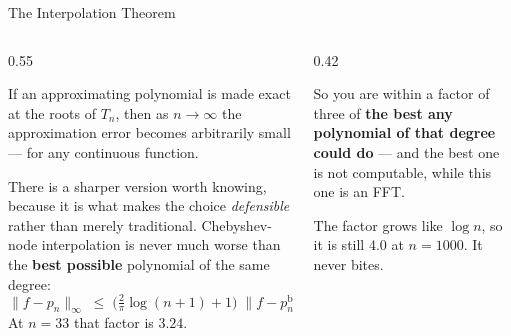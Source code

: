 \begin{frame}{The Interpolation Theorem}
\begin{columns}[T]
\begin{column}{0.55\textwidth}
\small
\begin{conceptbox}[title=\textbf{Chebyshev Interpolation Theorem}]\small
If an approximating polynomial is made exact at the roots of $T_n$, then as $n\to\infty$ the approximation error becomes arbitrarily small --- for any continuous function.
\end{conceptbox}
\medskip
There is a sharper version worth knowing, because it is what makes the choice \emph{defensible} rather than merely traditional. Chebyshev-node interpolation is never much worse than the \textbf{best possible} polynomial of the same degree:
\[
  \|f-p_n\|_{\infty}\;\le\;\Big(\tfrac{2}{\pi}\log(n+1)+1\Big)\;\|f-p_n^{\text{best}}\|_{\infty}.
\]
At $n=33$ that factor is $\mathbf{3.24}$.
\end{column}
\begin{column}{0.42\textwidth}
\begin{takeawaybox}\footnotesize
So you are within a factor of three of \textbf{the best any polynomial of that degree could do} --- and the best one is not computable, while this one is an FFT.
\end{takeawaybox}
\medskip
\begin{cautionbox}\footnotesize
The factor grows like $\log n$, so it is still $4.0$ at $n=1000$. It never bites.
\end{cautionbox}
\end{column}
\end{columns}
\vspace{1mm}
\end{frame}

